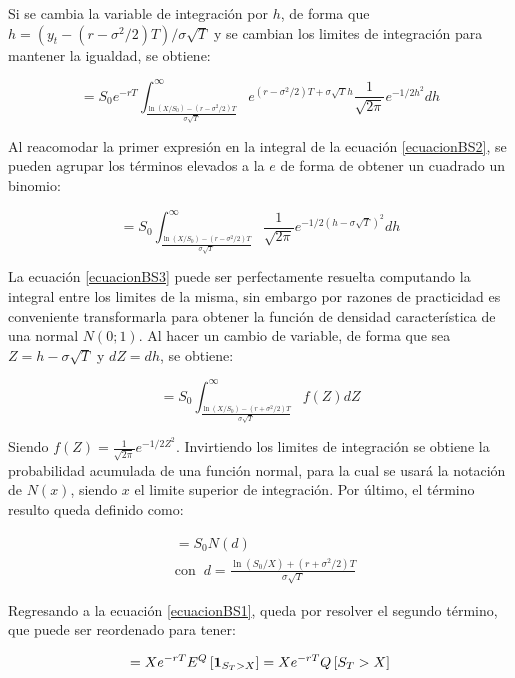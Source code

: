 Si se cambia la variable de integración por $h$, de forma que $h=(y_t - (r-\sigma^2/2) T) / \sigma\sqrt{T}$ y se cambian los limites de integración para mantener la igualdad, se obtiene:

\begin{equation}
	= S_0 e^{-r T} \int_{\tfrac{\ln(X/S_0) - (r-\sigma^2/2) T}{\sigma \sqrt{T}}}^\infty{
		e^{(r-\sigma^2/2) T + \sigma \sqrt{T} h}
		\frac{1}{\sqrt{2 \pi}} e^{-1/2 h^2} dh} \label{ecuacionBS2}
\end{equation}

Al reacomodar la primer expresión en la integral de la ecuación \eqref{ecuacionBS2}, se pueden agrupar los términos elevados a la $e$ de forma de obtener un cuadrado un binomio:


\begin{equation}
	= S_0 \int_{\tfrac{\ln(X/S_0) - (r-\sigma^2/2) T}{\sigma \sqrt{T}}}^\infty{
		\frac{1}{\sqrt{2 \pi}} e^{-1/2 (h-\sigma \sqrt{T})^2} dh} \label{ecuacionBS3}
\end{equation}

La ecuación \eqref{ecuacionBS3} puede ser perfectamente resuelta computando la integral entre los limites de la misma, sin embargo por razones de practicidad es conveniente transformarla para obtener la función de densidad característica de una normal $N(0;1)$. Al hacer un cambio de variable, de forma que sea $Z = h - \sigma \sqrt{T}$ y $dZ = dh$, se obtiene:

\begin{equation}
	= S_0 \int_{\tfrac{\ln(X/S_0) - (r+\sigma^2/2) T}{\sigma \sqrt{T}}}^\infty{
		f(Z) dZ} \label{ecuacionBS4}
\end{equation}

Siendo $f(Z) = \frac{1}{\sqrt{2\pi}} e^{-1/2 Z^2}$. Invirtiendo los limites de integración se obtiene la probabilidad acumulada de una función normal, para la cual se usará la notación de $N(x)$, siendo $x$ el limite superior de integración. Por último, el término resulto queda definido como:

\begin{align}
	&= S_0 N(d)\\
	&\mathrm{con}\;\; d = \frac{\ln(S_0/X) + (r+\sigma^2/2) T}{\sigma \sqrt{T}} \label{bsparte1}
\end{align}

Regresando a la ecuación \eqref{ecuacionBS1}, queda por resolver el segundo término, que puede ser reordenado para tener:

\[
= X e^{-rT} E^Q\left[\mathbf{1}_{S_T > X}\right] = X e^{-r T} Q\left[S_T > X\right]
\]

